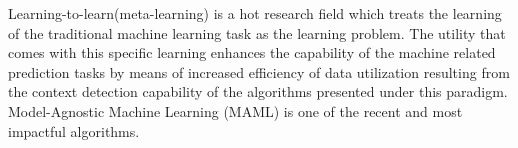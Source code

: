 Learning-to-learn(meta-learning) is a hot research field which treats the learning of the traditional machine learning task as the learning problem. The utility that comes with this specific learning enhances the capability of the machine related prediction tasks by means of increased efficiency of data utilization resulting from the context detection capability of the algorithms presented under this paradigm. Model-Agnostic Machine Learning (MAML)\cite{Finn2017} is one of the recent and most impactful algorithms. 
